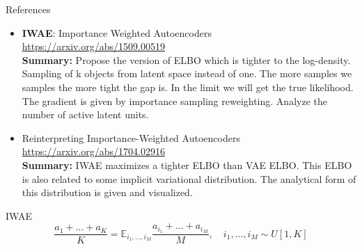 \begin{frame}{References}
{\begin{itemize}
    \item \textbf{IWAE}: Importance Weighted Autoencoders \\
    \href{https://arxiv.org/abs/1509.00519}{https://arxiv.org/abs/1509.00519} \\
    \textbf{Summary:} Propose the version of ELBO which is tighter to the log-density. Sampling of k objects from latent space instead of one. The more samples we samples the more tight the gap is. In the limit we will get the true likelihood. The gradient is given by importance sampling reweighting. Analyze the number of active latent units.
    
    \item Reinterpreting Importance-Weighted Autoencoders \\
    \href{https://arxiv.org/abs/1704.02916}{https://arxiv.org/abs/1704.02916} \\
    \textbf{Summary:} IWAE maximizes a tighter ELBO than VAE ELBO. This ELBO is also related to some implicit variational distribution. The analytical form of this distribution is given and visualized. 
    
\end{itemize}
}
\end{frame}
\begin{frame}{IWAE}
\[
\frac{a_1 + \dots + a_K}{K} = \mathbb{E}_{i_1, \dots, i_M} \frac{a_{i_1} + \dots + a_{i_M}}{M}, \quad i_1, \dots, i_M \sim U[1, K]
\]
\end{frame}

 